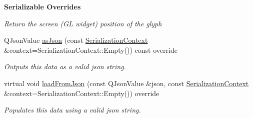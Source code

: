 \begin{Indent}\textbf{ Serializable Overrides}\par
{\em Return the screen (GL widget) position of the glyph }\begin{DoxyCompactItemize}
\item 
\mbox{\label{classrev_1_1_glyph_a0ae8efa7d6cf4e59abcb0d672468e72d}} 
Q\+Json\+Value \mbox{\hyperlink{classrev_1_1_glyph_a0ae8efa7d6cf4e59abcb0d672468e72d}{as\+Json}} (const \mbox{\hyperlink{structrev_1_1_serialization_context}{Serialization\+Context}} \&context=Serialization\+Context\+::\+Empty()) const override
\begin{DoxyCompactList}\small\item\em Outputs this data as a valid json string. \end{DoxyCompactList}\item 
\mbox{\label{classrev_1_1_glyph_ac0772fef5969cb255a892bad0a75239d}} 
virtual void \mbox{\hyperlink{classrev_1_1_glyph_ac0772fef5969cb255a892bad0a75239d}{load\+From\+Json}} (const Q\+Json\+Value \&json, const \mbox{\hyperlink{structrev_1_1_serialization_context}{Serialization\+Context}} \&context=Serialization\+Context\+::\+Empty()) override
\begin{DoxyCompactList}\small\item\em Populates this data using a valid json string. \end{DoxyCompactList}\end{DoxyCompactItemize}
\end{Indent}
